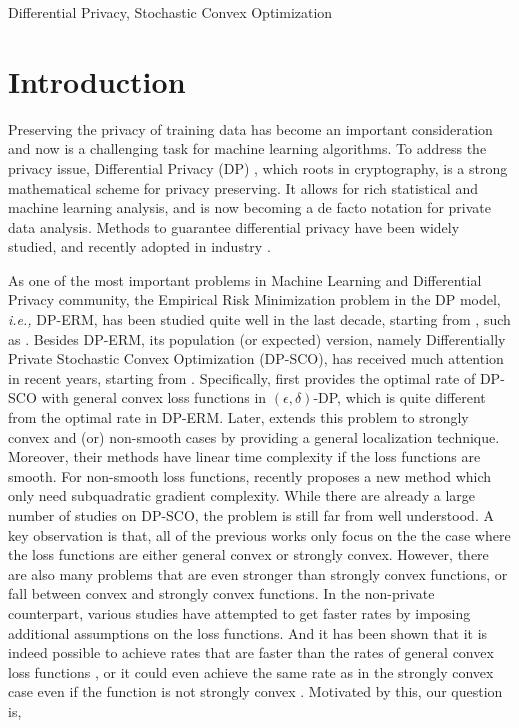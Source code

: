 \documentclass[12pt]{alt2022} %
\begin{document}
\begin{keywords}%
Differential Privacy, Stochastic Convex Optimization
\end{keywords}

\section{Introduction}
Preserving the privacy of training data has become an important consideration and now is a challenging task for machine learning algorithms. To address the privacy issue, Differential Privacy (DP) \citep{dwork2006calibrating}, which roots in cryptography, is a strong mathematical scheme for privacy preserving. It allows for rich statistical and machine learning analysis, and is now becoming a de facto notation for private data analysis.  Methods to guarantee differential privacy have been widely studied, and recently adopted in industry \citep{apple,ding2017collecting}.  

As one of the most important problems in Machine Learning and Differential Privacy community,  the Empirical Risk Minimization problem in the DP model, {\em i.e.,} DP-ERM, has been studied quite well in the last decade, starting from \citep{chaudhuri2011differentially},  such as \citep{bassily2014private, wang2017differentially,wang2019differentially,wu2017bolt,kasiviswanathan2016efficient,kifer2012private,smith2017interaction,wang2018empirical,wang2019noninteractive,asi2021private}. Besides DP-ERM, its population (or expected) version, namely Differentially Private Stochastic Convex Optimization (DP-SCO), has received much attention in recent years, starting from \citep{bassily2014private}. Specifically,  \citep{bassily2019private} first provides the optimal rate of DP-SCO with general convex loss functions in $(\epsilon, \delta)$-DP, which is quite different from the optimal rate in DP-ERM. Later, \citep{feldman2020private} extends this problem to strongly convex and (or) non-smooth cases by providing a general localization technique. Moreover, their methods have linear time complexity if the loss functions are smooth. For non-smooth loss functions, \citep{kulkarni2021private} recently proposes a new method which only need subquadratic gradient complexity. While there are already a large number of studies on DP-SCO, the problem is still far from well understood. A key observation is that, all of the previous 
works only focus on the the case where the loss functions are either general convex or strongly convex. However, there are also many problems that are even stronger than strongly convex functions, or fall between convex and strongly convex functions. In the non-private counterpart, various studies have attempted to get faster rates by imposing additional assumptions on the loss functions. And it has been shown that it is indeed possible to achieve rates that are faster than the rates of general convex loss functions \citep{yang2018simple,koren2015fast,van2015fast}, or it could even achieve the same rate as in the strongly convex case even if the function is not strongly convex \citep{karimi2016linear,liu2018fast,xu2017stochastic}. Motivated by this, our question is,
\end{document}
